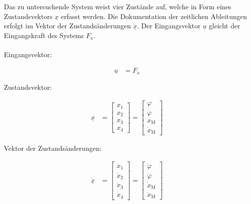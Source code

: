 Das zu untersuchende System weist vier Zustände auf, welche in Form eines Zustandsvektors $\underline{x}$ erfasst werden. Die Dokumentation der zeitlichen Ableitungen erfolgt im Vektor der Zustandsänderungen $\dot{\underline{x}}$. Der Eingangsvektor $\underline{u}$ gleicht der Eingangskraft des Systems $F_{\mathrm{a}}$.\\\\
Eingangsvektor:

\begin{align}\label{eq:Gleichung23}
    \underline{u} &= F_{\mathrm{a}}
\end{align}

Zustandsvektor:

\begin{align}
    \underline{x} &=
    \begin{bmatrix}\label{eq:Gleichung24}
        x_{\mathrm{1}} \\
        x_{\mathrm{2}} \\
        x_{\mathrm{3}} \\
        x_{\mathrm{4}}
    \end{bmatrix} =
    \begin{bmatrix}
        \varphi         \\
        \dot \varphi    \\
        x_{\mathrm{M}}  \\
        \dot x_{\mathrm{M}}
    \end{bmatrix}
\end{align}

Vektor der Zustandsänderungen:

\begin{align}\label{eq:Gleichung25}
    \dot{\underline{x}} &=
    \begin{bmatrix}
        \dot x_{\mathrm{1}} \\
        \dot x_{\mathrm{2}} \\
        \dot x_{\mathrm{3}} \\
        \dot x_{\mathrm{4}}
    \end{bmatrix} =
    \begin{bmatrix}
        \dot{\varphi}           \\
        \ddot{\varphi}          \\
        \dot{x}_{\mathrm{M}}    \\
        \ddot{x}_{\mathrm{M}}
    \end{bmatrix}
\end{align}

